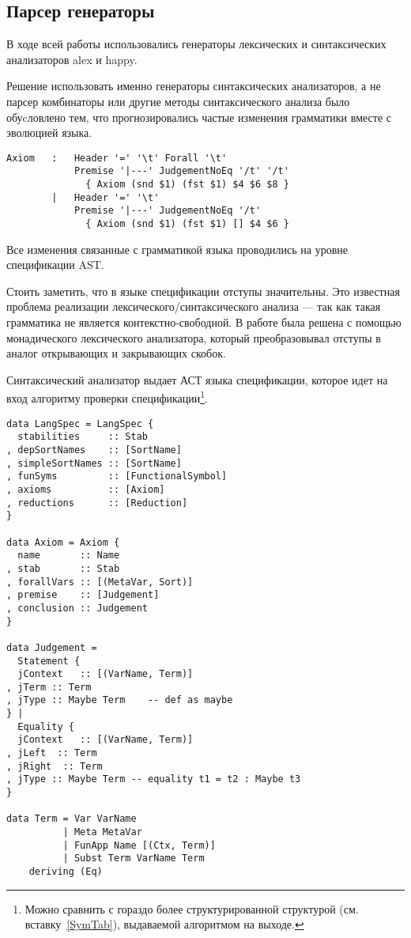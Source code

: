 \subsection{Парсер генераторы}
В ходе всей работы использовались генераторы лексических и синтаксических анализаторов alex\cite{alex} и happy\cite{happy}.

Решение использовать именно генераторы синтаксических анализаторов, а не парсер комбинаторы\cite{parsec} или другие методы синтаксического анализа было обуcловлено тем, что прогнозировались частые изменения грамматики вместе с эволюцией языка.

\begin{lstlisting}[caption={Часть спецификации синтаксического анализатора},captionpos=b, frame=single]
Axiom   :   Header '=' '\t' Forall '\t'
            Premise '|---' JudgementNoEq '/t' '/t'
              { Axiom (snd $1) (fst $1) $4 $6 $8 }
        |   Header '=' '\t'
            Premise '|---' JudgementNoEq '/t'
              { Axiom (snd $1) (fst $1) [] $4 $6 }
\end{lstlisting}

Все изменения связанные с грамматикой языка проводились на уровне спецификации AST.

\hfill

Стоить заметить, что в языке спецификации отступы значительны. Это известная проблема реализации лексического/синтаксического анализа --- так как такая грамматика не является контекстно-свободной. В работе была решена с помощью монадического лексического анализатора, который преобразовывал отступы в аналог открывающих и закрывающих скобок.

Синтаксический анализатор выдает АСТ языка спецификации, которое идет на вход алгоритму проверки спецификации\footnote{Можно сравнить с гораздо более структурированной структурой (см. вставку~\ref{SymTab}), выдаваемой алгоритмом на выходе.}.

\begin{lstlisting}[caption={АСТ языка спецификации},captionpos=b,frame=single]
data LangSpec = LangSpec {
  stabilities     :: Stab
, depSortNames    :: [SortName]
, simpleSortNames :: [SortName]
, funSyms         :: [FunctionalSymbol]
, axioms          :: [Axiom]
, reductions      :: [Reduction]
}

data Axiom = Axiom {
  name       :: Name
, stab       :: Stab
, forallVars :: [(MetaVar, Sort)]
, premise    :: [Judgement]
, conclusion :: Judgement
}

data Judgement =
  Statement {
  jContext   :: [(VarName, Term)]
, jTerm :: Term
, jType :: Maybe Term    -- def as maybe
} |
  Equality {
  jContext   :: [(VarName, Term)]
, jLeft  :: Term
, jRight  :: Term
, jType :: Maybe Term -- equality t1 = t2 : Maybe t3
}

data Term = Var VarName
          | Meta MetaVar
          | FunApp Name [(Ctx, Term)]
          | Subst Term VarName Term
    deriving (Eq)
\end{lstlisting}


